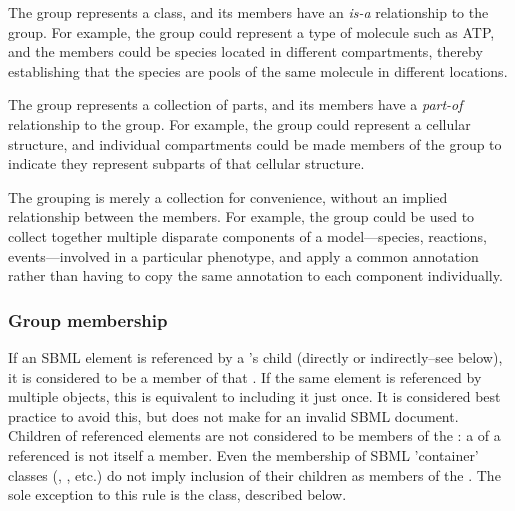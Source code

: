 \begin{description}[font=\normalfont\ttfamily\color{black},style=nextline]

\item[\token{classification}] The group represents a class, and its members have an \emph{is-a} relationship to the group.  For example, the group could represent a type of molecule such as ATP, and the members could be species located in different compartments, thereby establishing that the species are pools of the same molecule in different locations.

\item[\token{partonomy}] The group represents a collection of parts, and its members have a \emph{part-of} relationship to the group.  For example, the group could represent a cellular structure, and individual compartments could be made members of the group to indicate they represent subparts of that cellular structure.

\item[\token{collection}] The grouping is merely a collection for convenience, without an implied relationship between the members.  For example, the group could be used to collect together multiple disparate components of a model---species, reactions, events---involved in a particular phenotype, and apply a common annotation rather than having to copy the same annotation to each component individually.

\end{description}

\begin{blockChanged}
\subsubsection{Group membership}
\label{group-membership}

If an SBML element is referenced by a \Group's child \Member (directly or indirectly--see below), it is considered to be a member of that \Group.  If the same element is referenced by multiple \Member objects, this is equivalent to including it just once.  It is considered best practice to avoid this, but does not make for an invalid SBML document.  Children of referenced elements are not considered to be members of the \Group: a \KineticLaw of a referenced \Reaction is not itself a \Group member.  Even the membership of SBML 'container' classes (\ListOfSpecies, \ListOfCompartments, etc.) do not imply inclusion of their children as members of the \Group.  The sole exception to this rule is the \ListOfMembers class, described below. 
\end{blockChanged}


